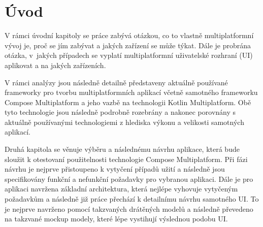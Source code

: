 \chapter{Úvod}
\setcounter{page}{1}



V rámci úvodní kapitoly se práce zabývá otázkou, co to vlastně multiplatformní vývoj je, proč se jím zabývat a jakých zařízení se může týkat.
Dále je probrána otázka, v~jakých případech se vyplatí multiplatformní uživatelské rozhraní (UI) aplikovat a na jakých zařízeních. 





V rámci analýzy jsou následně detailně představeny aktuálně používané frameworky pro tvorbu multiplatformních aplikací včetně samotného
frameworku Compose Multiplatform a jeho vazbě na technologii Kotlin Multiplatform. Obě tyto technologie jsou následně podrobně rozebrány
a nakonec porovnány s aktuálně používanými technologiemi z hlediska výkonu a velikosti samotných aplikací.

\medskip

Druhá kapitola se věnuje výběru a následnému návrhu aplikace, která bude sloužit k otestovaní použitelnosti technologie Compose Multiplatform.
Při fázi návrhu je nejprve přistoupeno k vytyčení případů užití a následně jsou specifikovány funkční a nefunkční požadavky pro vybranou aplikaci.
Dále je pro aplikaci navržena základní architektura, která nejlépe vyhovuje vytyčeným požadavkům a následně již práce přechází k detailnímu
návrhu samotného UI. To je nejprve navrženo pomocí takzvaných drátěných modelů a následně převedeno na takzvané mockup modely, které
lépe vystihují výslednou podobu UI.

